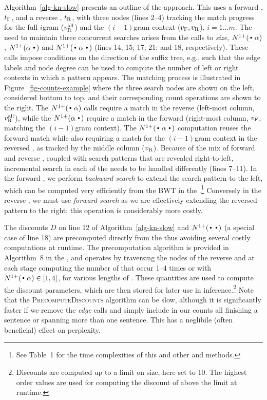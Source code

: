 Algorithm~\ref{alg-kn-slow} presents an outline of the approach.
This uses a forward \CST, $t_{\text{F}}$, and a reverse \CST, $t_{\text{R}}$, with three \CST nodes (lines 2--4) tracking the match progress for the full $i$gram ($v_{\text{R}}^{\text{all}}$) and the $(i-1)$gram context ($v_{\text{F}}, v_{\text{R}}$), $i=1 \ldots m$.
The need to maintain three concurrent searches arises from the calls to \emph{size}, $\nlplus{\dotpat}$, $\nlplus{\patdot}$ and $\nlplus{\dotpatdot}$ (lines 14, 15; 17; 21; and 18, respectively).
These calls impose conditions on the direction of the suffix tree, e.g., such that the edge 
labels and node degree can be used to compute the number of left or right contexts in which a pattern appears. 
The matching process is illustrated in Figure~\ref{fig-counts-example} where the three search nodes are shown on the left, considered bottom to top, and their corresponding count operations are shown to the right.
The $\nlplus{\dotpat}$ calls require a match in the reverse \CST (left-most column, $v_{\text{R}}^{\text{all}}$), while the $\nlplus{\patdot}$ require a match in the forward \CST (right-most column, $v_{\text{F}}$, matching the $(i-1)$gram context). 
The $\nlplus{\dotpatdot}$ computation reuses the forward match while also requiring a match for the $(i-1)$gram context in the reversed \CST, as tracked by the middle column ($v_{\text{R}}$).
Because of the mix of forward and reverse \CSTs, coupled with search patterns that are revealed right-to-left, incremental search in each of the \CSTs needs to be handled differently (lines 7--11).
In the forward \CST, we perform \emph{backward search} to extend the search pattern to the left, which can be computed very efficiently from the BWT in the \CSA.\footnote{See \supp Table~1 for the time complexities of this and other \CSA and \CST methods.}
Conversely in the reverse \CST, we must use \emph{forward search} as we are effectively extending the reversed pattern to the right; this operation is considerably more costly.

The discounts $D$ on line 12 of Algorithm~\ref{alg-kn-slow} and
$\nlplus{\Bigcdot\Bigcdot}$ (a special case of line 18) are precomputed directly from the \CSTs thus avoiding several costly computations at runtime. 
The precomputation algorithm is provided in Algorithm~8 in the \supp,
and operates by traversing the nodes of the reverse \CST and at each
stage computing the number of \ngrams that occur 1--4 times or with
$\nlplus{\dotpat} \in [1,4]$, for various lengths of \ngrams.
These quantities are used to compute the discount parameters, which
are then stored for later use in inference.\footnote{Discounts are computed up to a limit on \ngram size, here set to 10. The highest order values are used for computing the discount of \ngrams above the limit at runtime.}
Note that the \textsc{PrecomputeDiscounts} algorithm can be slow,
although it is significantly faster if we remove the \emph{edge} calls
and simply include in our counts all \ngrams finishing a sentence or
spanning more than one sentence.
This has a neglibile (often beneficial) effect on perplexity.

